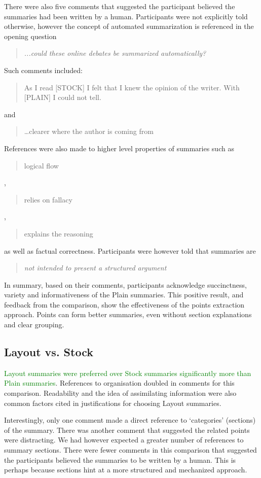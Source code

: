       There were also five comments that suggested the participant believed the summaries had been written by a human. Participants were not explicitly told otherwise, however the concept of automated summarization is referenced in the opening question \blockquote{\textit{...could these online debates be summarized automatically?}}. Such comments included: \blockquote{As I read [STOCK] I felt that I knew the opinion of the writer. With [PLAIN] I could not tell.} and \blockquote{\dots clearer where the author is coming from}. References were also made to higher level properties of summaries such as \blockquote{logical flow}, \blockquote{relies on fallacy}, \blockquote{explains the reasoning} as well as factual correctness. Participants were however told that summaries are \blockquote{\textit{not intended to present a structured argument}}.

      In summary, based on their comments, participants acknowledge succinctness, variety and informativeness of the Plain summaries. This positive result, and feedback from the comparison, show the effectiveness of the points extraction approach. Points can form better summaries, even without section explanations and clear grouping.

    \tocless\subsection{Layout vs. Stock}
      \textcolor{green}{Layout summaries were preferred over Stock summaries significantly more than Plain summaries}. References to organisation doubled in comments for this comparison. Readability and the idea of assimilating information were also common factors cited in justifications for choosing Layout summaries.

      Interestingly, only one comment made a direct reference to `categories' (sections) of the summary. There was another comment that suggested the related points were distracting. We had however expected a greater number of references to summary sections. There were fewer comments in this comparison that suggested the participants believed the summaries to be written by a human. This is perhaps because sections hint at a more structured and mechanized approach.

